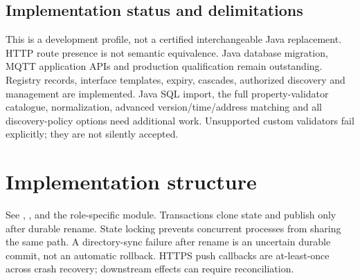 \documentclass[a4paper]{arrowhead}
\begin{document}
\subsection{Implementation status and delimitations}
This is a development profile, not a certified interchangeable Java replacement. HTTP route presence is not semantic equivalence. Java database migration, MQTT application APIs and production qualification remain outstanding.
Registry records, interface templates, expiry, cascades, authorized discovery and management are implemented. Java SQL import, the full property-validator catalogue, normalization, advanced version/time/address matching and all discovery-policy options need additional work. Unsupported custom validators fail explicitly; they are not silently accepted.
\section{Implementation structure}
See , ,  and the role-specific module. Transactions clone state and publish only after durable rename. State locking prevents concurrent processes from sharing the same path. A directory-sync failure after rename is an uncertain durable commit, not an automatic rollback. HTTPS push callbacks are at-least-once across crash recovery; downstream effects can require reconciliation.
\end{document}
